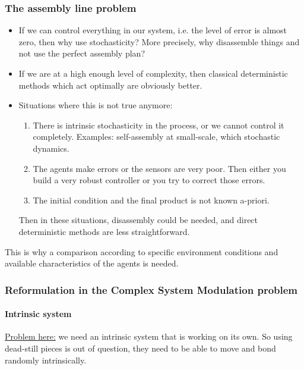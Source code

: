 \documentclass[letterpaper, oneside]{article}
\begin{document}
\subsubsection{The assembly line problem} %
\label{ssub:the_assembly_line_problem}
\begin{itemize}
	\item If we can control everything in our system, i.e. the level of error is almost zero, then why use stochasticity? More precisely, why disassemble things and not use the perfect assembly plan?
	\item If we are at a high enough level of complexity, then classical deterministic methods which act optimally are obviously better.
	\item Situations where this is not true anymore:
		\begin{enumerate}
			\item There is intrinsic stochasticity in the process, or we cannot control it completely. Examples: self-assembly at small-scale, which stochastic dynamics.
			\item The agents make errors or the sensors are very poor. Then either you build a very robust controller or you try to correct those errors.
			\item The initial condition and the final product is not known a-priori.
		\end{enumerate}
		Then in these situations, disassembly could be needed, and direct deterministic methods are less straightforward.
\end{itemize}

This is why a comparison according to specific environment conditions and available characteristics of the agents is needed.

\subsubsection{Reformulation in the Complex System Modulation problem} %
\label{ssub:reformulation_in_the_complex_system_modulation_problem}

\paragraph{Intrinsic system} %
\label{par:intrinsic_system}
\underline{Problem here:} we need an intrinsic system that is working on its own. So using dead-still pieces is out of question, they need to be able to move and bond randomly intrinsically.
\end{document}
